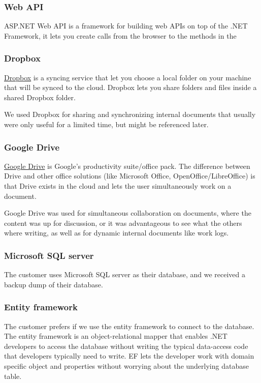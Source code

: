 \subsubsection{Web API}
ASP.NET Web API is a framework for building web APIs on top of the .NET Framework, it lets you create calls from the browser to the methods in the 

\subsubsection{Dropbox}
\href{http://www.dropbox.com}{Dropbox} is a syncing service that let you choose a local folder on your machine that will be synced to the cloud. Dropbox lets you share folders and files inside a shared Dropbox folder.

We used Dropbox for sharing and synchronizing internal documents that usually were only useful for a limited time, but might be referenced later.

\subsubsection{Google Drive}
\href{https://drive.google.com/}{Google Drive} is Google's productivity suite/office pack. The difference between Drive and other office solutions (like Microsoft Office, OpenOffice/LibreOffice) is that Drive exists in the cloud and lets the user simultaneously work on a document.

Google Drive was used for simultaneous collaboration on documents, where the content was up for discussion, or it was advantageous to see what the others where writing, as well as for dynamic internal documents like work logs.

\subsubsection{Microsoft SQL server}
The customer uses Microsoft SQL server as their database, and we received a backup dump of their database. %

\subsubsection{Entity framework}
The customer prefers if we use the entity framework to connect to the database. The entity framework is an object-relational mapper that enables .NET developers to access the database without writing the typical data-access code that developers typically need to write. EF lets the developer work with domain specific object and properties without worrying about the underlying database table.

